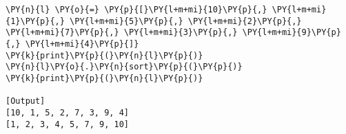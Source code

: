 \begin{Verbatim}[label=\makebox{\url{https://github.com/lucabaldini/cmepda/tree/master/slides/latex/snippets/timsort.py}},commandchars=\\\{\}]
\PY{n}{l} \PY{o}{=} \PY{p}{[}\PY{l+m+mi}{10}\PY{p}{,} \PY{l+m+mi}{1}\PY{p}{,} \PY{l+m+mi}{5}\PY{p}{,} \PY{l+m+mi}{2}\PY{p}{,} \PY{l+m+mi}{7}\PY{p}{,} \PY{l+m+mi}{3}\PY{p}{,} \PY{l+m+mi}{9}\PY{p}{,} \PY{l+m+mi}{4}\PY{p}{]}
\PY{k}{print}\PY{p}{(}\PY{n}{l}\PY{p}{)}
\PY{n}{l}\PY{o}{.}\PY{n}{sort}\PY{p}{(}\PY{p}{)}
\PY{k}{print}\PY{p}{(}\PY{n}{l}\PY{p}{)}

[Output]
[10, 1, 5, 2, 7, 3, 9, 4]
[1, 2, 3, 4, 5, 7, 9, 10]
\end{Verbatim}